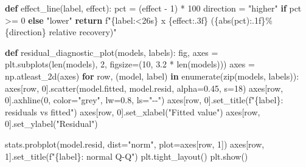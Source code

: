 \documentclass[
  letterpaper,
  DIV=11,
  numbers=noendperiod]{scrartcl}
\newenvironment{Shaded}{\begin{snugshade}}{\end{snugshade}}
\newcommand{\BuiltInTok}[1]{\textcolor[rgb]{0.00,0.23,0.31}{#1}}
\newcommand{\ControlFlowTok}[1]{\textcolor[rgb]{0.00,0.23,0.31}{\textbf{#1}}}
\newcommand{\DecValTok}[1]{\textcolor[rgb]{0.68,0.00,0.00}{#1}}
\newcommand{\FloatTok}[1]{\textcolor[rgb]{0.68,0.00,0.00}{#1}}
\newcommand{\KeywordTok}[1]{\textcolor[rgb]{0.00,0.23,0.31}{\textbf{#1}}}
\newcommand{\NormalTok}[1]{\textcolor[rgb]{0.00,0.23,0.31}{#1}}
\newcommand{\OperatorTok}[1]{\textcolor[rgb]{0.37,0.37,0.37}{#1}}
\newcommand{\SpecialCharTok}[1]{\textcolor[rgb]{0.37,0.37,0.37}{#1}}
\newcommand{\SpecialStringTok}[1]{\textcolor[rgb]{0.13,0.47,0.30}{#1}}
\newcommand{\StringTok}[1]{\textcolor[rgb]{0.13,0.47,0.30}{#1}}
\begin{document}
\begin{Shaded}
\begin{Highlighting}[]
\KeywordTok{def}\NormalTok{ effect\_line(label, effect):}
\NormalTok{    pct }\OperatorTok{=}\NormalTok{ (effect }\OperatorTok{{-}} \DecValTok{1}\NormalTok{) }\OperatorTok{*} \DecValTok{100}
\NormalTok{    direction }\OperatorTok{=} \StringTok{"higher"} \ControlFlowTok{if}\NormalTok{ pct }\OperatorTok{\textgreater{}=} \DecValTok{0} \ControlFlowTok{else} \StringTok{"lower"}
    \ControlFlowTok{return} \SpecialStringTok{f"}\SpecialCharTok{\{}\NormalTok{label}\SpecialCharTok{:\textless{}26s\}}\SpecialStringTok{ x }\SpecialCharTok{\{}\NormalTok{effect}\SpecialCharTok{:.3f\}}\SpecialStringTok{   (}\SpecialCharTok{\{}\BuiltInTok{abs}\NormalTok{(pct)}\SpecialCharTok{:.1f\}}\SpecialStringTok{\% }\SpecialCharTok{\{}\NormalTok{direction}\SpecialCharTok{\}}\SpecialStringTok{ relative recovery)"}

\KeywordTok{def}\NormalTok{ residual\_diagnostic\_plot(models, labels):}
\NormalTok{    fig, axes }\OperatorTok{=}\NormalTok{ plt.subplots(}\BuiltInTok{len}\NormalTok{(models), }\DecValTok{2}\NormalTok{, figsize}\OperatorTok{=}\NormalTok{(}\DecValTok{10}\NormalTok{, }\FloatTok{3.2} \OperatorTok{*} \BuiltInTok{len}\NormalTok{(models)))}
\NormalTok{    axes }\OperatorTok{=}\NormalTok{ np.atleast\_2d(axes)}
    \ControlFlowTok{for}\NormalTok{ row, (model, label) }\KeywordTok{in} \BuiltInTok{enumerate}\NormalTok{(}\BuiltInTok{zip}\NormalTok{(models, labels)):}
\NormalTok{        axes[row, }\DecValTok{0}\NormalTok{].scatter(model.fitted, model.resid, alpha}\OperatorTok{=}\FloatTok{0.45}\NormalTok{, s}\OperatorTok{=}\DecValTok{18}\NormalTok{)}
\NormalTok{        axes[row, }\DecValTok{0}\NormalTok{].axhline(}\DecValTok{0}\NormalTok{, color}\OperatorTok{=}\StringTok{"grey"}\NormalTok{, lw}\OperatorTok{=}\FloatTok{0.8}\NormalTok{, ls}\OperatorTok{=}\StringTok{"{-}{-}"}\NormalTok{)}
\NormalTok{        axes[row, }\DecValTok{0}\NormalTok{].set\_title(}\SpecialStringTok{f"}\SpecialCharTok{\{}\NormalTok{label}\SpecialCharTok{\}}\SpecialStringTok{: residuals vs fitted"}\NormalTok{)}
\NormalTok{        axes[row, }\DecValTok{0}\NormalTok{].set\_xlabel(}\StringTok{"Fitted value"}\NormalTok{)}
\NormalTok{        axes[row, }\DecValTok{0}\NormalTok{].set\_ylabel(}\StringTok{"Residual"}\NormalTok{)}

\NormalTok{        stats.probplot(model.resid, dist}\OperatorTok{=}\StringTok{"norm"}\NormalTok{, plot}\OperatorTok{=}\NormalTok{axes[row, }\DecValTok{1}\NormalTok{])}
\NormalTok{        axes[row, }\DecValTok{1}\NormalTok{].set\_title(}\SpecialStringTok{f"}\SpecialCharTok{\{}\NormalTok{label}\SpecialCharTok{\}}\SpecialStringTok{: normal Q{-}Q"}\NormalTok{)}
\NormalTok{    plt.tight\_layout()}
\NormalTok{    plt.show()}
\end{Highlighting}
\end{Shaded}
\end{document}
